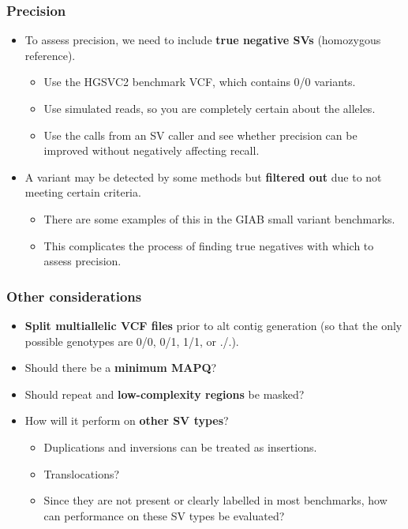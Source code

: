 \documentclass{article}
\begin{document}
\subsubsection{Precision}

\begin{itemize}
\item To assess precision, we need to include \textbf{true negative SVs} (homozygous reference).\begin{itemize}
\item Use the HGSVC2 benchmark VCF, which contains 0/0 variants.
\item Use simulated reads, so you are completely certain about the alleles.
\item Use the calls from an SV caller and see whether precision can be improved without negatively affecting recall.
\end{itemize}


\item A variant may be detected by some methods but \textbf{filtered out} due to not meeting certain criteria.\begin{itemize}
\item There are some examples of this in the GIAB small variant benchmarks.
\item This complicates the process of finding true negatives with which to assess precision.
\end{itemize}
\end{itemize}

\subsubsection{Other considerations}

\begin{itemize}
\item \textbf{Split multiallelic VCF files} prior to alt contig generation (so that the only possible genotypes are 0/0, 0/1, 1/1, or ./.).
\item Should there be a \textbf{minimum MAPQ}?
\item Should repeat and \textbf{low-complexity regions} be masked?
\item How will it perform on \textbf{other SV types}?\begin{itemize}
\item Duplications and inversions can be treated as insertions.
\item Translocations?
\item Since they are not present or clearly labelled in most benchmarks, how can performance on these SV types be evaluated?
\end{itemize}
\end{itemize}
\end{document}
